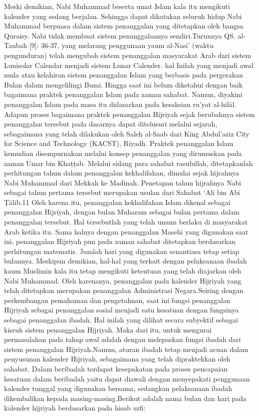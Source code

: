     Meski demikian, Nabi Muhammad beserta umat Islam kala itu mengikuti kalender yang sedang berjalan. Sehingga dapat dikatakan seluruh hidup Nabi Muhammad berpuasa dalam sistem penanggalan yang ditetapkan oleh bangsa Quraisy. Nabi tidak membuat sistem penanggalannya sendiri.Turunnya QS.
    al-Taubah [9]: 36-37, yang melarang penggunaan yaum al-Nasi’ (waktu pengunduran) telah mengubah sistem penanggalan masyarakat Arab dari sistem Lunisolar Calendar menjadi sistem Lunar Calender. hal Inilah yang menjadi awal mula atau kelahiran sistem penanggalan Islam yang berbasis pada pergerakan Bulan dalam mengelilingi Bumi.
    Hingga saat ini belum diketahui dengan baik bagaimana praktek penanggalan Islam pada zaman sahabat. Namun, diyakini penanggalan Islam pada masa itu didasarkan pada kesaksian ru’yat al-hilāl. Adapun proses bagaimana praktek penanggalan Hijriyah sejak berubahnya sistem penanggalan tersebut pada dasarnya dapat ditelusuri melalui sejarah, sebagaimana yang telah dilakukan oleh Saleh al-Saab dari King Abdul’aziz City for Science and Technology (KACST), Riyadh.
    Praktek penanggalan Islam kemudian disempurnakan melalui konsep penanggalan yang dirumuskan pada zaman Umar bin Khaṭṭab. Melalui sidang para sahabat rasulullah, ditetapkanlah perhitungan tahun dalam penanggalan kekhalifahan, dimulai sejak hijrahnya Nabi Muhammad dari Mekkah ke Madinah.
    Penetapan tahun hijrahnya Nabi sebagai tahun pertama tersebut merupakan usulan dari Sahabat ‘Ali bin Abī Ṭālib.11 Oleh karena itu, penanggalan kekhalifahan Islam dikenal sebagai penanggalan Hijriyah, dengan bulan Muharam sebagai bulan pertama dalam penanggalan tersebut. Hal tersebutlah yang telah umum berlaku di masyarakat Arab ketika itu.
    Sama halnya dengan penanggalan Masehi yang digunakan saat ini, penanggalan Hijriyah pun pada zaman sahabat ditetapkan berdasarkan perhitungan matematis. Jumlah hari yang digunakan senantiasa tetap setiap bulannya. Meskipun demikian, hal-hal yang terkait dengan pelaksanaan ibadah kaum Muslimin kala itu tetap mengikuti ketentuan yang telah diajarkan oleh Nabi Muhammad.
    Oleh karenanya, penanggalan pada kalender Hijriyah yang telah ditetapkan merupakan penanggalan Administrasi Negara.Seiring dengan perkembangan pemahaman dan pengetahuan, saat ini fungsi penanggalan Hijriyah sebagai penanggalan sosial menjadi satu kesatuan dengan fungsinya sebagai penanggalan ibadah. Hal inilah yang dilihat secara subyektif sebagai kisruh sistem penanggalan Hijriyah.
    Maka dari itu, untuk mengurai permasalahan pada tahap awal adalah dengan melepaskan fungsi ibadah dari sistem penanggalan Hijriyah.Namun, aturan ibadah tetap menjadi acuan dalam penyusunan kalender Hijriyah, sebagaimana yang telah dipraktekkan oleh sahabat. Dalam beribadah terdapat kesepakatan pada proses pencapaian kesatuan dalam beribadah yaitu dapat diawali dengan menyepakati penggunaan kalender tunggal yang digunakan bersama, sedangkan pelaksanaan ibadah dikembalikan kepada masing-masing.Berikut adalah nama bulan dan hari pada kalender hijriyah berdasarkan pada hisab urfi:
